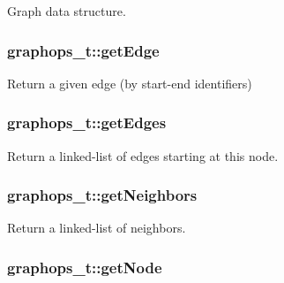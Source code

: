 Graph data structure. 

\subsubsection[{\texorpdfstring{get\+Edge}{getEdge}}]{ graphops\+\_\+t\+::get\+Edge}\hypertarget{structgraphops__t_aafbe3ec7bdce040b86d7748c953cf607}{}\label{structgraphops__t_aafbe3ec7bdce040b86d7748c953cf607}


Return a given edge (by start-\/end identifiers) 

\subsubsection[{\texorpdfstring{get\+Edges}{getEdges}}]{ graphops\+\_\+t\+::get\+Edges}\hypertarget{structgraphops__t_a87fec7e1150c05e54e34ab09fe401eaa}{}\label{structgraphops__t_a87fec7e1150c05e54e34ab09fe401eaa}


Return a linked-\/list of edges starting at this node. 

\subsubsection[{\texorpdfstring{get\+Neighbors}{getNeighbors}}]{ graphops\+\_\+t\+::get\+Neighbors}\hypertarget{structgraphops__t_ac6c5bec2f102e4da5959cc3db66ac3c6}{}\label{structgraphops__t_ac6c5bec2f102e4da5959cc3db66ac3c6}


Return a linked-\/list of neighbors. 

\subsubsection[{\texorpdfstring{get\+Node}{getNode}}]{ graphops\+\_\+t\+::get\+Node}\hypertarget{structgraphops__t_ab410442ef123fc79f1c8a431502e2a23}{}\label{structgraphops__t_ab410442ef123fc79f1c8a431502e2a23}


